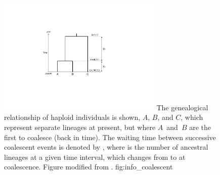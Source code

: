 

\begin{figure}[!htb]
\centering
\includegraphics[width=0.7\textwidth]{./img/ch1/info_coalescent}
{The genealogical relationship of  haploid individuals is shown, $A$, $B$, and $C$, which represent separate lineages at present, but where $A$~and~$B$ are the first to coalesce (back in time).
The waiting time between successive coalescent events is denoted by , where  is the number of ancestral lineages at a given time interval, which changes from  to  at coalescence.
Figure modified from \citet{nordborg2001coalescent}.}
{fig:info_coalescent}
\end{figure}
